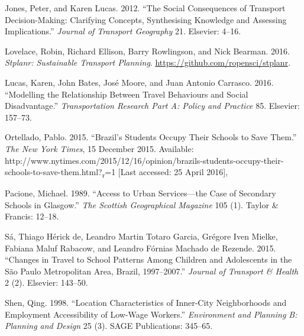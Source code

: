 \documentclass[]{article}
\begin{document}
Jones, Peter, and Karen Lucas. 2012. ``The Social Consequences of
Transport Decision-Making: Clarifying Concepts, Synthesising Knowledge
and Assessing Implications.'' \emph{Journal of Transport Geography} 21.
Elsevier: 4--16.

Lovelace, Robin, Richard Ellison, Barry Rowlingson, and Nick Bearman.
2016. \emph{Stplanr: Sustainable Transport Planning}.
\url{https://github.com/ropensci/stplanr}.

Lucas, Karen, John Bates, Jos{é} Moore, and Juan Antonio Carrasco. 2016.
``Modelling the Relationship Between Travel Behaviours and Social
Disadvantage.'' \emph{Transportation Research Part A: Policy and
Practice} 85. Elsevier: 157--73.

Ortellado, Pablo. 2015. ``Brazil's Students Occupy Their Schools to Save
Them.'' \emph{The New York Times}, 15 December 2015. Available:
http://www.nytimes.com/2015/12/16/opinion/brazils-students-occupy-their-schools-to-save-them.html?\textsubscript{r}=1
{[}Last accessed: 25 April 2016{]},

Pacione, Michael. 1989. ``Access to Urban Services---the Case of
Secondary Schools in Glasgow.'' \emph{The Scottish Geographical
Magazine} 105 (1). Taylor \& Francis: 12--18.

S{á}, Thiago H{é}rick de, Leandro Martin Totaro Garcia, Gr{é}gore Iven
Mielke, Fabiana Maluf Rabacow, and Leandro F{ó}rnias Machado de Rezende.
2015. ``Changes in Travel to School Patterns Among Children and
Adolescents in the São Paulo Metropolitan Area, Brazil, 1997--2007.''
\emph{Journal of Transport \& Health} 2 (2). Elsevier: 143--50.

Shen, Qing. 1998. ``Location Characteristics of Inner-City Neighborhoods
and Employment Accessibility of Low-Wage Workers.'' \emph{Environment
and Planning B: Planning and Design} 25 (3). SAGE Publications: 345--65.
\end{document}
